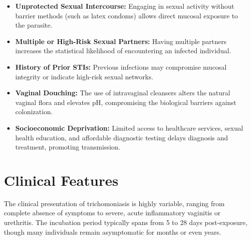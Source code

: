 \begin{itemize}
    \begin{itemize}
        \item \textbf{Unprotected Sexual Intercourse:} Engaging in sexual activity without barrier methods (such as latex condoms) allows direct mucosal exposure to the parasite.
        \item \textbf{Multiple or High-Risk Sexual Partners:} Having multiple partners increases the statistical likelihood of encountering an infected individual.
        \item \textbf{History of Prior STIs:} Previous infections may compromise mucosal integrity or indicate high-risk sexual networks.
        \item \textbf{Vaginal Douching:} The use of intravaginal cleansers alters the natural vaginal flora and elevates pH, compromising the biological barriers against colonization.
        \item \textbf{Socioeconomic Deprivation:} Limited access to healthcare services, sexual health education, and affordable diagnostic testing delays diagnosis and treatment, promoting transmission.
    \end{itemize}
\end{itemize}

\section*{Clinical Features}
The clinical presentation of trichomoniasis is highly variable, ranging from complete absence of symptoms to severe, acute inflammatory vaginitis or urethritis. The incubation period typically spans from 5 to 28 days post-exposure, though many individuals remain asymptomatic for months or even years.

